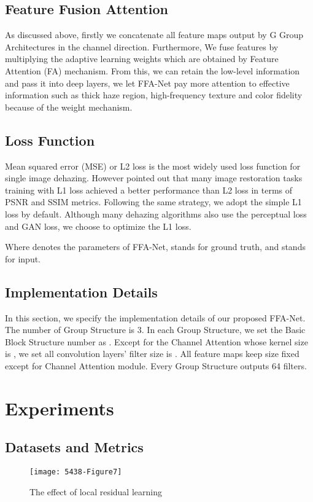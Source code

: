 \documentclass[letterpaper]{article} \usepackage{aaai20}  \usepackage{times}  \usepackage{helvet} \usepackage{courier}  \usepackage[hyphens]{url}  \usepackage{graphicx} \urlstyle{rm} \def\UrlFont{\rm}  \usepackage{graphicx}  \frenchspacing  \setlength{\pdfpagewidth}{8.5in}  \setlength{\pdfpageheight}{11in}  \usepackage{bm}
\begin{document}
\subsection{Feature Fusion Attention }
As discussed above, firstly we concatenate all feature maps output by G Group Architectures in the channel direction. Furthermore, We fuse features by multiplying the adaptive learning weights which are obtained by Feature Attention (FA) mechanism. From this, we can retain the low-level information and pass it into deep layers, we let FFA-Net pay more attention to effective information such as thick haze region, high-frequency texture and color fidelity because of the weight mechanism.



\subsection{Loss Function}
Mean squared error (MSE) or L2 loss is the most widely used loss function for single image dehazing. However \cite{edsr}  pointed out that many image restoration tasks training with L1 loss achieved a better performance than L2 loss in terms of PSNR and SSIM metrics. Following the same strategy, we adopt the simple L1 loss by default. Although many dehazing algorithms also use the perceptual loss and GAN loss, we  choose to optimize the L1 loss.


Where  denotes the parameters of FFA-Net,  stands for ground truth, and  stands for input.

\subsection{Implementation Details}
In this section, we specify the implementation details of our proposed FFA-Net. The number of Group Structure   is 3. In each Group Structure, we set the Basic Block Structure number as . Except for the Channel Attention whose kernel size is , we set all convolution layers’ filter size is . All feature maps keep size fixed except for Channel Attention module. Every Group Structure outputs 64 filters.

\section{Experiments}

\subsection{Datasets and Metrics}
 \begin{figure}[t]
	\centering
	\texttt{[image: 5438-Figure7]} \caption{The effect of local residual learning }
	\label{fig7}
\end{figure}
\end{document}
